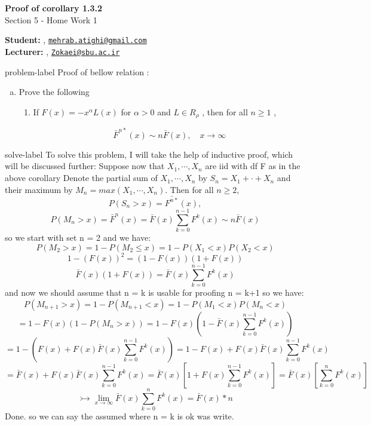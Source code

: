 	






		\begin{Large}
		\textsf{\textbf{Proof of corollary 1.3.2}}\\
		Section 5 - Home Work 1
	\end{Large}
	
	\vspace{1ex}
	
	\textsf{\textbf{Student:}} , \href{mailto:mehrab.atighi@gmail.com}{\texttt{mehrab.atighi@gmail.com}}\\
	\textsf{\textbf{Lecturer:}} , \href{mailto:Zokaei@sbu.ac.ir}{\texttt{Zokaei@sbu.ac.ir}}
	
	
	\vspace{2ex}
	
	\begin{problem}{}{problem-label}
		Proof of bellow relation \cite{Embrechts.etal1997}:

		\begin{enumerate}[(a)]
			\item Prove the following
			\begin{enumerate}[label = (\roman*)]
				\item If $F(x) = -x^{\alpha} L(x)$ for $\alpha > 0$  and $L \in R_{\rho}$ , then for all $n \geq 1$ ,
				
				$$\bar{F}^{n*}(x) \sim n \bar{F}(x), \quad x \rightarrow \infty$$
				
			\end{enumerate}
		\end{enumerate}
	\end{problem}
	
	\begin{solve}{}{solve-label}
		To solve this problem, I will take the help of inductive proof, which will be discussed further:
		Suppose now that $X_1 , \cdots , X_n$ are iid with df F as in the above corollary Denote the partial sum of $X_1 , \cdots , X_n$ by $S_n = X_1 + \cdot + X_n$ and their maximum by $M_n = max(X_1 , \cdots , X_n).$ Then for all $n \geq 2$,
		$$P(S_n>x) = \bar{F^{n*}}(x) ,$$
		$$P(M_n >x) = \bar{F}^n(x) = \bar{F}(x) \sum_{k=0}^{n-1} F^{k}(x) \sim n \bar{F}(x)$$
		so we start with set n = 2 and we have:
		$$P(M_2 > x) = 1 - P(M_2 \leq x) = 1 - P(X_1 <x) P(X_2 <x)$$
		$$1 - (F(x))^2 = (1-F(x))(1+F(x)) $$
		$$\bar{F}(x)(1+F(x)) = \bar{F}(x)\sum_{k=0}^{n-1}F^k(x)$$
		and now we should assume that n = k is usable for proofing n = k+1 so we have:
		$$P(M_{n+1} > x) = 1-P(M_{n+1} <x) = 1-P(M_1<x) P(M_n<x)$$
		$$= 1-F(x)(1-P(M_n>x)) = 1-F(x)(1-\bar{F}(x)\sum_{k=0}^{n-1}F^k(x)) $$
		$$= 1 - (F(x) + F(x)\bar{F}(x)\sum_{k=0}^{n-1}F^k(x)) = 1 - F(x) + F(x)\bar{F}(x)\sum_{k=0}^{n-1}F^k(x)$$
		$$= \bar{F}(x) + F(x)\bar{F}(x)\sum_{k=0}^{n-1}F^k(x) = \bar{F}(x)[1+F(x)\sum_{k=0}^{n-1}F^k(x)] = \bar{F}(x)[\sum_{k=0}^{n}F^k(x)]$$
		$$\rightarrowtail \lim_{x \to \infty}\bar{F}(x)\sum_{k=0}^{n}F^k(x) = \bar{F}(x) * n$$
		Done. so we can say the assumed where n = k is ok was write.
	\end{solve}
	
	
	
	
	
